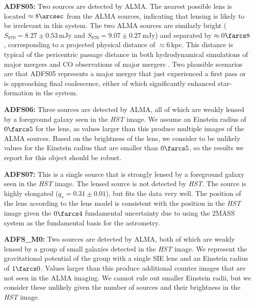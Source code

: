 \documentclass[iop]{emulateapj}
\begin{document}
{\bf ADFS05:} Two sources are detected by ALMA.  The nearest possible lens is
located $\approx 8\arcsec$ from the ALMA sources, indicating that lensing is
likely to be irrelevant in this system.  The two ALMA sources are similarly
bright ($S_{870} = 8.27 \pm 0.53\,$mJy and $S_{870} = 9.07 \pm 0.27\,$mJy) and
separated by $\approx 0\farcs8$, corresponding to a projected physical distance
of $\approx 6\,$kpc. This distance is typical of the pericentric passage
distance in both hydrodynamical simulations of major mergers
\citep[e.g.,][]{Hayward:2012lr} and CO observations of major mergers
\citep[e.g.,][]{2008ApJ...680..246T, 2010ApJ...724..233E, 2011ApJ...733L..11R,
2011MNRAS.412.1913I}.  Two plausible scenarios are that ADFS05 represents a
major merger that just experienced a first pass or is approaching final
coalescence, either of which significantly enhanced star-formation in the
system.

{\bf ADFS06:} Three sources are detected by ALMA, all of which are weakly
lensed by a foreground galaxy seen in the {\it HST} image.  We assume an
Einstein radius of $0\farcs5$ for the lens, as values larger than this produce
multiple images of the ALMA sources.  Based on the brightness of the lens, we
consider to be unlikely values for the Einstein radius that are smaller than
$0\farcs5$, so the results we report for this object should be robust.

{\bf ADFS07:} This is a single source that is strongly lensed by a foreground
galaxy seen in the {\it HST} image.  The lensed source is not detected by {\it
HST}.  The source is highly elongated ($q_s = 0.31 \pm 0.01$), but fits the
data very well.  The position of the lens according to the lens model is
consistent with the position in the {\it HST} image given the $0\farcs4$
fundamental uncertainty due to using the 2MASS system as the fundamental basis
for the astrometry.

{\bf ADFS\_M0:} Two sources are detected by ALMA, both of which are weakly
lensed by a group of small galaxies detected in the {\it HST} image.  We
represent the gravitational potential of the group with a single SIE lens and
an Einstein radius of $1\farcs0$.  Values larger than this produce additional
counter images that are not seen in the ALMA imaging.  We cannot rule out
smaller Einstein radii, but we consider these unlikely given the number of
sources and their brightness in the {\it HST} image.
\end{document}

